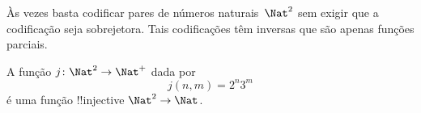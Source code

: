 \documentclass[../../../include/open-logic-section]{subfiles}
\begin{document}
Às vezes basta codificar pares de números naturais~$\Nat^2$
sem exigir que a codificação seja sobrejetora. Tais codificações têm
inversas que são apenas funções parciais.

\begin{ex}
A função $j\colon \Nat^2 \to \Nat^+$ dada por
\[
j(n,m) = 2^n3^m
\]
é uma função !!{injective} $\Nat^2 \to \Nat$.
\end{ex}
\end{document}
